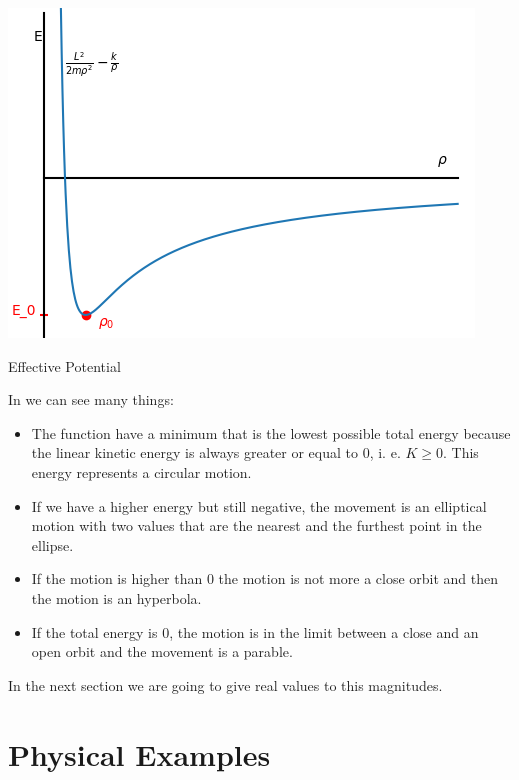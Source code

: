 \begin{marginfigure}
    \includegraphics{images/General_Potential_Well.png}
    \caption[Effective Potential]{Effective Potential}
\end{marginfigure}

In  we can see many things:

\begin{itemize}
    \item The function have a minimum that is the lowest possible total energy because the linear kinetic energy is always greater or equal to 0, i. e. $K\geq0$. This energy represents a circular motion.
    
    \item If we have a higher energy but still negative, the movement is an elliptical motion with two values that are the nearest and the furthest point in the ellipse.
    
    \item If the motion is higher than 0 the motion is not more a close orbit and then the motion is an hyperbola.
    
    \item If the total energy is 0, the motion is in the limit between a close and an open orbit and the movement is a parable.
\end{itemize}

In the next section we are going to give real values to this magnitudes.

\section{Physical Examples}

